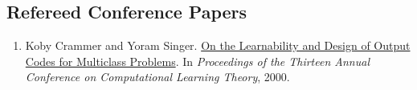 \documentclass{resume}
\newcommand{\nolineskips}{
\setlength{\parskip}{1pt}
\setlength{\parsep}{1pt}
\setlength{\topsep}{1pt}
\setlength{\partopsep}{1pt}
\setlength{\itemsep}{1pt}}
\begin{document}
\subsection*{Refereed Conference Papers}
\begin{enumerate}
\nolineskips



\item
{Koby Crammer} and Yoram Singer.
\href{http://www.cis.upenn.edu/~crammer/publications/colt00.pdf}{On the Learnability and Design of Output Codes for Multiclass Problems}.
In {\em Proceedings of the Thirteen Annual Conference on Computational Learning Theory}, 2000.


\end{enumerate}
\end{document}
